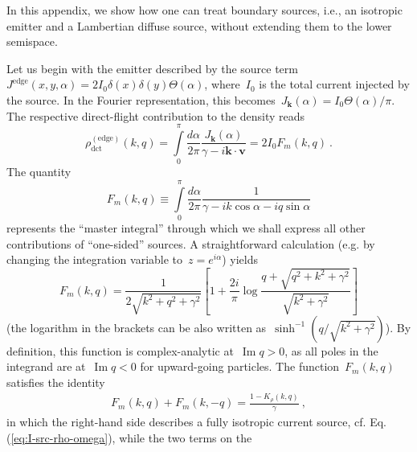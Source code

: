 \documentclass[preprint,aps,eqsecnum, prb]{revtex4-1}
\renewcommand{\Im}{\mathop{\mathrm{Im}}\nolimits}
\newcommand{\dct}[1]{{#1}_\mathrm{dct}}
\begin{document}

In this appendix, we show how one can treat boundary sources,
i.e., an isotropic emitter and a Lambertian diffuse source, without extending
them to the lower semispace.

Let us begin with the emitter described by the source term
$J^{\mathrm{edge}}(x, y, \alpha) = 2 I_0 \delta(x)\delta(y) \Theta(\alpha)$,
where~$I_0$ is the total current injected by the source. In the Fourier
representation, this becomes~$J_{\bm k}(\alpha) = I_0 \Theta(\alpha) / \pi$.
The respective direct-flight contribution to the density reads
\begin{equation}
   \label{eq:source-surf-rho-app}
  \dct{\rho}^{\mathrm{(edge)}}(k, q)
  = \int\limits_{0}^{\pi}
         \frac{d\alpha}{2\pi} \frac{J_{\bm k}(\alpha)}{\gamma
                               - i {\bm k} \cdot {\bm v}} = 2 I_0 F_m(k, q) \ .
\end{equation}
The quantity
\begin{equation}
F_m(k, q) \equiv \int\limits_{0}^{\pi}  \frac{d\alpha}{2\pi}
               \frac{1}{\gamma - i k \cos \alpha - i q \sin\alpha}
\end{equation}
represents the ``master integral'' through which we shall express
all other contributions of ``one-sided'' sources.
A straightforward calculation (e.g. by changing the
integration variable to~$z = e^{i\alpha}$) yields
\begin{equation}
  \label{eq:source-fm-def}
  F_m(k, q) = \frac{1}{2\sqrt{k^2 + q^2 + \gamma^2}}
  \left[1 + \frac{2i}{\pi}
               \log\frac{q + \sqrt{q^2 + k^2 + \gamma^2}}{\sqrt{k^2 + \gamma^2}}\right]
\end{equation}
(the logarithm in the brackets can be also written
as~$\sinh^{-1} (q / \sqrt{k^2 + \gamma^2})$). By definition, this function
is complex-analytic at~$\Im q > 0$, as all poles in the integrand are
at~$\Im q < 0$ for upward-going particles. The function~$F_m(k, q)$
satisfies the identity
\begin{align}
  \label{eq:fm-identity}
  F_m(k, q) + F_m(k, -q) = \frac{1 - K_\rho(k, q)}{\gamma} \ ,
\end{align}
in which the right-hand side describes a fully isotropic current source,
cf. Eq.(\ref{eq:I-src-rho-omega}), while the two terms on the
\end{document}
